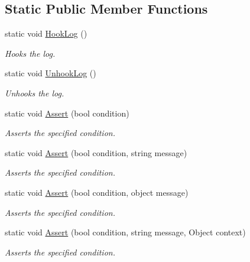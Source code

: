 \subsection*{Static Public Member Functions}
\begin{DoxyCompactItemize}
\item 
static void \hyperlink{class_lerp2_a_p_i_1_1___debug_1_1_debug_a936ca4a49dceb721d2bdc27f2cd05d36}{Hook\+Log} ()
\begin{DoxyCompactList}\small\item\em Hooks the log. \end{DoxyCompactList}\item 
static void \hyperlink{class_lerp2_a_p_i_1_1___debug_1_1_debug_a1aa3ea68fe6f8721675539f3dddaff8f}{Unhook\+Log} ()
\begin{DoxyCompactList}\small\item\em Unhooks the log. \end{DoxyCompactList}\item 
static void \hyperlink{class_lerp2_a_p_i_1_1___debug_1_1_debug_abb6e811db2846e5569c741793173039b}{Assert} (bool condition)
\begin{DoxyCompactList}\small\item\em Asserts the specified condition. \end{DoxyCompactList}\item 
static void \hyperlink{class_lerp2_a_p_i_1_1___debug_1_1_debug_a55863e880370c7d30971775495b3797c}{Assert} (bool condition, string message)
\begin{DoxyCompactList}\small\item\em Asserts the specified condition. \end{DoxyCompactList}\item 
static void \hyperlink{class_lerp2_a_p_i_1_1___debug_1_1_debug_ae67942ab4fefc4f50717b0853c9e147f}{Assert} (bool condition, object message)
\begin{DoxyCompactList}\small\item\em Asserts the specified condition. \end{DoxyCompactList}\item 
static void \hyperlink{class_lerp2_a_p_i_1_1___debug_1_1_debug_a7fa3269678ad95e6c55ae3a9c193b39e}{Assert} (bool condition, string message, Object context)
\begin{DoxyCompactList}\small\item\em Asserts the specified condition. \end{DoxyCompactList}\item 

\end{DoxyCompactItemize}
